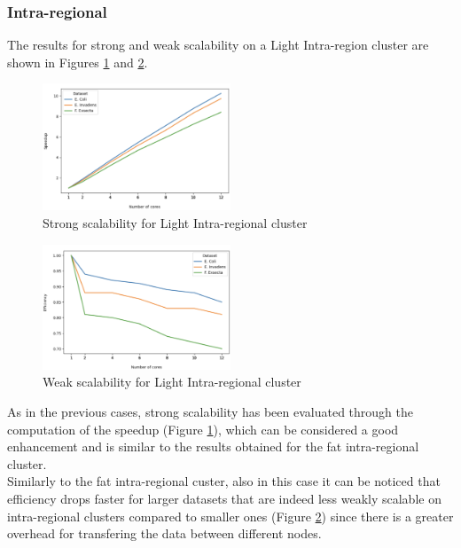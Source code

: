 \documentclass[final,5p,times,twocolumn,authoryear]{elsarticle}
\begin{document}
\subsubsection{Intra-regional}
The results for strong and weak scalability on a Light Intra-region cluster are shown in Figures \ref{fig:light-intra-strong} and \ref{fig:light-intra-weak}. \\
\begin{figure}
    \centering
    \includegraphics[width=0.5\textwidth]{images/light_intra_strong.png}
    \caption{Strong scalability for Light Intra-regional cluster }
    \label{fig:light-intra-strong}
\end{figure}
\begin{figure}
    \centering
    \includegraphics[width=0.5\textwidth]{images/light_intra_weak.png}
    \caption{Weak scalability for Light Intra-regional cluster }
    \label{fig:light-intra-weak}
\end{figure}
As in the previous cases, strong scalability has been evaluated through the computation of the speedup (Figure \ref{fig:light-intra-strong}), which can be considered a good enhancement and is similar to the results obtained for the fat intra-regional cluster. \\
Similarly to the fat intra-regional custer, also in this case it can be noticed that efficiency drops faster for larger datasets that are indeed less weakly scalable on intra-regional clusters compared to smaller ones (Figure \ref{fig:light-intra-weak}) since there is a greater overhead for transfering the data between different nodes.
\end{document}
